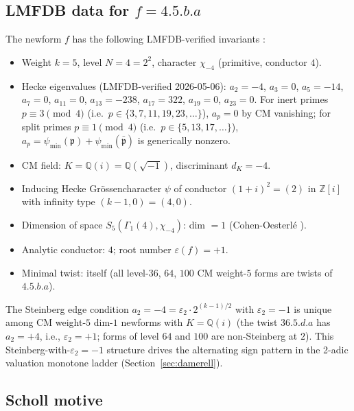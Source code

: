 \documentclass[12pt]{amsart}
\theoremstyle{definition}
\newcommand{\Z}{\mathbb{Z}}
\newcommand{\Q}{\mathbb{Q}}
\begin{document}
\subsection{LMFDB data for \texorpdfstring{$f = 4.5.b.a$}{f = 4.5.b.a}}

The newform $f$ has the following LMFDB-verified invariants \cite{LMFDB}:
\begin{itemize}
  \item Weight $k = 5$, level $N = 4 = 2^2$, character $\chi_{-4}$ (primitive, conductor $4$).
  \item Hecke eigenvalues (LMFDB-verified 2026-05-06):
    $a_2 = -4$, $a_3 = 0$, $a_5 = -14$, $a_7 = 0$, $a_{11} = 0$,
    $a_{13} = -238$, $a_{17} = 322$, $a_{19} = 0$, $a_{23} = 0$.
    For inert primes $p \equiv 3 \pmod 4$ (i.e.\ $p \in \{3,7,11,19,23,\ldots\}$),
    $a_p = 0$ by CM vanishing; for split primes $p \equiv 1 \pmod 4$
    (i.e.\ $p \in \{5,13,17,\ldots\}$), $a_p = \psi_{\min}(\mathfrak{p}) +
    \psi_{\min}(\bar{\mathfrak{p}})$ is generically nonzero.
  \item CM field: $K = \Q(i) = \Q(\sqrt{-1})$, discriminant $d_K = -4$.
  \item Inducing Hecke Grössencharacter $\psi$ of conductor $(1+i)^2 = (2)$ in $\Z[i]$
    with infinity type $(k-1, 0) = (4, 0)$.
  \item Dimension of space $S_5(\Gamma_1(4), \chi_{-4})$: dim $= 1$ (Cohen-Oesterlé \cite{CO77}).
  \item Analytic conductor: $4$; root number $\varepsilon(f) = +1$.
  \item Minimal twist: itself (all level-$36$, $64$, $100$ CM weight-$5$ forms are twists of $4.5.b.a$).
\end{itemize}

The Steinberg edge condition $a_2 = -4 = \varepsilon_2 \cdot 2^{(k-1)/2}$ with $\varepsilon_2 = -1$
is unique among CM weight-$5$ dim-$1$ newforms with $K = \Q(i)$ (the twist $36.5.d.a$
has $a_2 = +4$, i.e., $\varepsilon_2 = +1$; forms of level $64$ and $100$ are non-Steinberg at $2$).
This Steinberg-with-$\varepsilon_2=-1$ structure drives the alternating sign pattern
in the 2-adic valuation monotone ladder (Section~\ref{sec:damerell}).

\subsection{Scholl motive}
\end{document}

